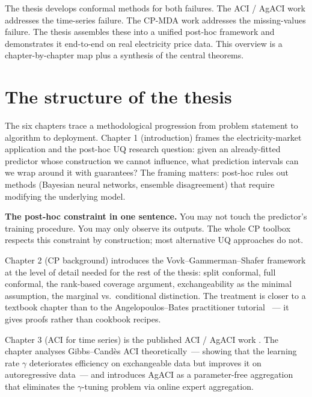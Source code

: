 \documentclass[letterpaper,11pt,leqno]{article}
\begin{document}
The thesis develops conformal methods for both failures. The ACI / AgACI work \cite{zaffran2022aci} addresses the time-series failure. The CP-MDA work \cite{zaffran2024missing} addresses the missing-values failure. The thesis assembles these into a unified post-hoc framework and demonstrates it end-to-end on real electricity price data. This overview is a chapter-by-chapter map plus a synthesis of the central theorems.

\section{The structure of the thesis}\label{s:structure}

The six chapters trace a methodological progression from problem statement to algorithm to deployment. Chapter 1 (introduction) frames the electricity-market application and the post-hoc UQ research question: given an already-fitted predictor whose construction we cannot influence, what prediction intervals can we wrap around it with guarantees? The framing matters: post-hoc rules out methods (Bayesian neural networks, ensemble disagreement) that require modifying the underlying model.

\begin{definitionexplain}
\textbf{The post-hoc constraint in one sentence.} You may not touch the predictor's training procedure. You may only observe its outputs. The whole CP toolbox respects this constraint by construction; most alternative UQ approaches do not.
\end{definitionexplain}

Chapter 2 (CP background) introduces the Vovk--Gammerman--Shafer framework \cite{vovk2005algorithmic} at the level of detail needed for the rest of the thesis: split conformal, full conformal, the rank-based coverage argument, exchangeability as the minimal assumption, the marginal vs.\ conditional distinction. The treatment is closer to a textbook chapter than to the Angelopoulos--Bates practitioner tutorial \cite{angelopoulos2022gentle}~--- it gives proofs rather than cookbook recipes.

Chapter 3 (ACI for time series) is the published ACI / AgACI work \cite{zaffran2022aci}. The chapter analyses Gibbs--Cand\`es ACI \cite{gibbs2021aci} theoretically~--- showing that the learning rate $\gamma$ deteriorates efficiency on exchangeable data but improves it on autoregressive data~--- and introduces AgACI as a parameter-free aggregation that eliminates the $\gamma$-tuning problem via online expert aggregation.
\end{document}
